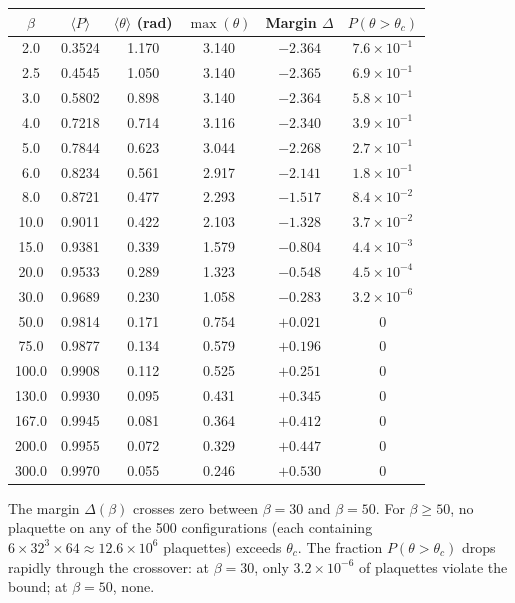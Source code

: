 \documentclass[11pt]{article}
\theoremstyle{definition}
\begin{document}
\begin{center}
\begin{tabular}{cccccc}
\toprule
$\beta$ & $\langle P\rangle$ & $\langle\theta\rangle$ (rad) &
$\max(\theta)$ & Margin $\Delta$ & $P(\theta>\theta_c)$\\
\midrule
2.0 & 0.3524 & 1.170 & 3.140 & $-2.364$ & $7.6\times 10^{-1}$\\
2.5 & 0.4545 & 1.050 & 3.140 & $-2.365$ & $6.9\times 10^{-1}$\\
3.0 & 0.5802 & 0.898 & 3.140 & $-2.364$ & $5.8\times 10^{-1}$\\
4.0 & 0.7218 & 0.714 & 3.116 & $-2.340$ & $3.9\times 10^{-1}$\\
5.0 & 0.7844 & 0.623 & 3.044 & $-2.268$ & $2.7\times 10^{-1}$\\
6.0 & 0.8234 & 0.561 & 2.917 & $-2.141$ & $1.8\times 10^{-1}$\\
8.0 & 0.8721 & 0.477 & 2.293 & $-1.517$ & $8.4\times 10^{-2}$\\
10.0 & 0.9011 & 0.422 & 2.103 & $-1.328$ & $3.7\times 10^{-2}$\\
15.0 & 0.9381 & 0.339 & 1.579 & $-0.804$ & $4.4\times 10^{-3}$\\
20.0 & 0.9533 & 0.289 & 1.323 & $-0.548$ & $4.5\times 10^{-4}$\\
30.0 & 0.9689 & 0.230 & 1.058 & $-0.283$ & $3.2\times 10^{-6}$\\
50.0 & 0.9814 & 0.171 & 0.754 & $+0.021$ & $0$\\
75.0 & 0.9877 & 0.134 & 0.579 & $+0.196$ & $0$\\
100.0 & 0.9908 & 0.112 & 0.525 & $+0.251$ & $0$\\
130.0 & 0.9930 & 0.095 & 0.431 & $+0.345$ & $0$\\
167.0 & 0.9945 & 0.081 & 0.364 & $+0.412$ & $0$\\
200.0 & 0.9955 & 0.072 & 0.329 & $+0.447$ & $0$\\
300.0 & 0.9970 & 0.055 & 0.246 & $+0.530$ & $0$\\
\bottomrule
\end{tabular}
\end{center}

The margin $\Delta(\beta)$ crosses zero between $\beta=30$ and
$\beta=50$.  For $\beta\ge 50$, no plaquette on any of the 500
configurations (each containing $6\times 32^3\times 64\approx
12.6\times 10^6$ plaquettes) exceeds $\theta_c$.
The fraction $P(\theta>\theta_c)$ drops rapidly through the
crossover: at $\beta=30$, only $3.2\times 10^{-6}$ of plaquettes
violate the bound; at $\beta=50$, none.
\end{document}
